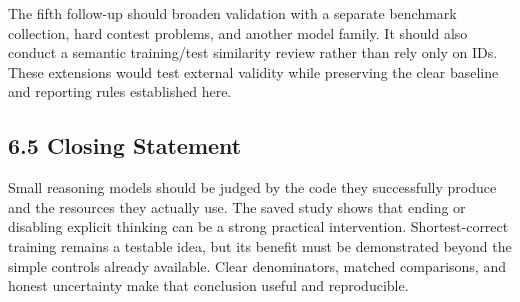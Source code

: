 \documentclass[11pt,letterpaper]{article}
\begin{document}
The fifth follow-up should broaden validation with a separate benchmark collection, hard contest problems, and another model family. It should also conduct a semantic training/test similarity review rather than rely only on IDs. These extensions would test external validity while preserving the clear baseline and reporting rules established here.\par

\subsection*{6.5 Closing Statement}

Small reasoning models should be judged by the code they successfully produce and the resources they actually use. The saved study shows that ending or disabling explicit thinking can be a strong practical intervention. Shortest-correct training remains a testable idea, but its benefit must be demonstrated beyond the simple controls already available. Clear denominators, matched comparisons, and honest uncertainty make that conclusion useful and reproducible.\par

\clearpage
\end{document}
